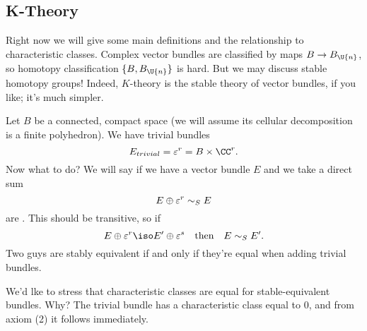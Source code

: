 \subsection{K-Theory}
Right now we will give some main definitions and the relationship
to characteristic classes. Complex vector bundles are classified
by maps $B\to B_{\U{n}}$, so homotopy classification
$\homotopyClass(B,B_{\U{n}})$ is hard. But we may discuss stable
homotopy groups! Indeed, $K$-theory is the stable theory of
vector bundles, if you like; it's much simpler.

Let $B$ be a connected, compact space (we will assume its
cellular decomposition is a finite polyhedron). We have trivial
bundles
\begin{equation}
E_{trivial} = \varepsilon^{r} = B\times\CC^{r}.
\end{equation}
Now what to do? We will say if we have  a vector bundle $E$ and
we take a direct sum
\begin{equation}
E\oplus\varepsilon^{r}\sim_{S} E
\end{equation}
are .
This should be transitive, so if 
\begin{equation}
E\oplus\varepsilon^r\iso E'\oplus\varepsilon^s\quad\mbox{then}\quad
E\stabequiv E'.
\end{equation}
Two guys are stably equivalent if and only if they're equal when
adding trivial bundles.

We'd lke to stress that characteristic
classes are equal for
stable-equivalent bundles. Why? The  trivial bundle has a
characteristic class equal to 0, and from axiom (2) it follows
immediately. 
